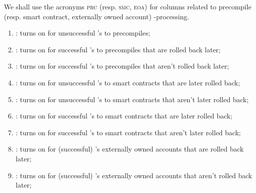\saNote{} We shall use the acronyms \textsc{prc} (resp. \textsc{smc}, \textsc{eoa}) for columns related to precompile (resp. smart contract, externally owned account) -processing.
\begin{enumerate}[resume]
	\item \scenCallPrcFailure:
		turns on for unsuccessful 's to precompiles;
	\item \scenCallPrcSuccessWillRevert:
		turns on for successful 's to precompiles that are rolled back later;
	\item \scenCallPrcSuccessWontRevert:
		turns on for successful 's to precompiles that aren't rolled back later;
	\item \scenCallSmcFailureWillRevert:
		turns on for unsuccessful 's to smart contracts that are later rolled back;
	\item \scenCallSmcFailureWontRevert:
		turns on for unsuccessful 's to smart contracts that aren't later rolled back;
	\item \scenCallSmcSuccessWillRevert:
		turns on for successful 's to smart contracts that are later rolled back;
	\item \scenCallSmcSuccessWontRevert:
		turns on for successful 's to smart contracts that aren't later rolled back;
	\item \scenCallEoaSuccessWillRevert:
		turns on for (successful) 's externally owned accounts that are rolled back later;
	\item \scenCallEoaSuccessWontRevert:
		turns on for (successful) 's externally owned accounts that aren't rolled back later;
\end{enumerate}
